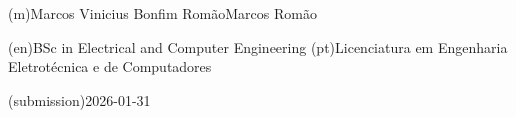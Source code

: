 %
%
\ntauthorname(m){Marcos Vinicius Bonfim Romão}{Marcos Romão}



%
%
%
\ntauthordegree(en){BSc in Electrical and Computer Engineering}
\ntauthordegree(pt){Licenciatura em Engenharia Eletrotécnica e de Computadores}



%
%
%

%
%
\ntdate(submission){2026-01-31}



